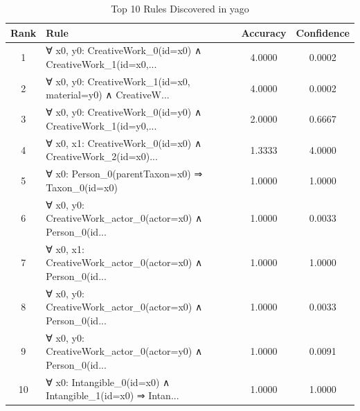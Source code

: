 \documentclass[11pt,a4paper]{article}
\begin{document}
\begin{table}[h!]
\centering
\small
\caption{Top 10 Rules Discovered in yago}
\label{tab:rules_yago}
\begin{tabular}{|c|p{5cm}|c|c|}
\hline
\textbf{Rank} & \textbf{Rule} & \textbf{Accuracy} & \textbf{Confidence} \\
\hline
1 & ∀ x0, y0: CreativeWork\_0(id=x0) ∧ CreativeWork\_1(id=x0,... & 4.0000 & 0.0002 \\
2 & ∀ x0, y0: CreativeWork\_1(id=x0, material=y0) ∧ CreativeW... & 4.0000 & 0.0002 \\
3 & ∀ x0, y0: CreativeWork\_0(id=y0) ∧ CreativeWork\_1(id=y0,... & 2.0000 & 0.6667 \\
4 & ∀ x0, x1: CreativeWork\_0(id=x0) ∧ CreativeWork\_2(id=x0)... & 1.3333 & 4.0000 \\
5 & ∀ x0: Person\_0(parentTaxon=x0) ⇒ Taxon\_0(id=x0) & 1.0000 & 1.0000 \\
6 & ∀ x0, y0: CreativeWork\_actor\_0(actor=x0) ∧ Person\_0(id... & 1.0000 & 0.0033 \\
7 & ∀ x0, x1: CreativeWork\_actor\_0(actor=x0) ∧ Person\_0(id... & 1.0000 & 1.0000 \\
8 & ∀ x0, y0: CreativeWork\_actor\_0(actor=x0) ∧ Person\_0(id... & 1.0000 & 0.0033 \\
9 & ∀ x0, y0: CreativeWork\_actor\_0(actor=y0) ∧ Person\_0(id... & 1.0000 & 0.0091 \\
10 & ∀ x0: Intangible\_0(id=x0) ∧ Intangible\_1(id=x0) ⇒ Intan... & 1.0000 & 1.0000 \\
\hline
\end{tabular}
\end{table}
\end{document}
